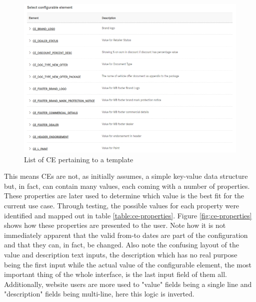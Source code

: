 \begin{figure}
  \centering
  \includegraphics[width=0.75\linewidth]{assets/pos-ce-config-2.png}
  \caption{List of CE pertaining to a template}
  \label{fig:pos:c}
\end{figure}

This means CEs are not, as initially assumes, a simple key-value data structure but, in fact, can contain many values, each coming with a number of properties. These properties are later used to determine which value is the best fit for the current use case. Through testing, the possible values for each property were identified and mapped out in table \ref{table:ce-properties}. Figure \ref{fig:ce-properties} shows how these properties are presented to the user. Note how it is not immediately apparent that the valid from-to dates are part of the configuration and that they can, in fact, be changed. Also note the confusing layout of the value and description text inputs, the description which has no real purpose being the first input while the actual value of the configurable element, the most important thing of the whole interface, is the last input field of them all. Additionally, website users are more used to "value" fields being a single line and "description" fields being multi-line, here this logic is inverted.

